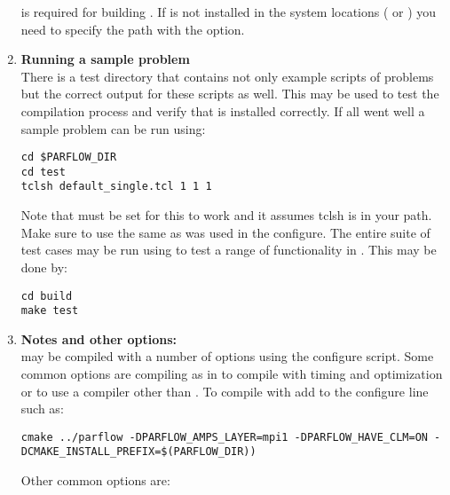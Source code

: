 \begin{enumerate}
 is required for building \parflow{}.  If  is not
installed in the system locations ( or )
you need to specify the path with the
 
option.

\item {\bf Running a sample problem}\\ There is a test directory that
contains not only example scripts of \parflow{} problems but the
correct output for these scripts as well.  This may be used to test
the compilation process and verify that \parflow{} is installed
correctly.  If all went well a sample \parflow{} problem can be run
using:

\begin{display}\begin{verbatim}
cd $PARFLOW_DIR
cd test
tclsh default_single.tcl 1 1 1
\end{verbatim}\end{display}

Note that  must be set for this to work and it
assumes tclsh is in your path.  Make sure to use the same 
as was used in the \cmake{} configure. The entire suite of test
cases may be run using \ctest{} to test a range of functionality in
\parflow{}.  This may be done by:
\begin{display}\begin{verbatim}
cd build
make test
\end{verbatim}\end{display}

\item {\bf Notes and other options:}\\ \parflow{} may be compiled with
a number of options using the configure script.  Some common options
are compiling  as in \cite{MM05,KM08a} to compile with
timing and optimization or to use a compiler other than .
To compile with  add  to the configure
line such as:

\begin{display}\begin{verbatim}
cmake ../parflow -DPARFLOW_AMPS_LAYER=mpi1 -DPARFLOW_HAVE_CLM=ON -DCMAKE_INSTALL_PREFIX=$(PARFLOW_DIR)) 
\end{verbatim}\end{display}

Other common options are:


\end{enumerate}
